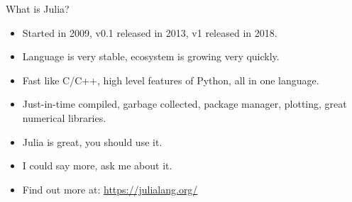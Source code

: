 \begin{frame}{What is Julia?}

\begin{itemize}[<+->]

  \item Started in 2009, v0.1 released in 2013, v1 released in 2018.
  \item Language is very stable, ecosystem is growing very quickly.
  \item Fast like C/C++, high level features of Python, all in one language.
  \item Just-in-time compiled, garbage collected, package manager, plotting, great numerical libraries.
  \item Julia is great, you should use it.
  \item I could say more, ask me about it.
  \item Find out more at: \url{https://julialang.org/}

\end{itemize}


\end{frame}
